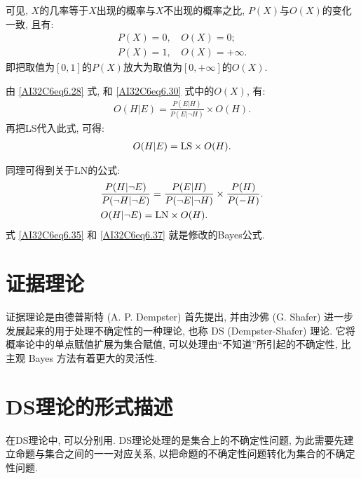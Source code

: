 可见, $X$的几率等于$X$出现的概率与$X$不出现的概率之比, $P(X)$与$O(X)$的变化一致, 且有:
\begin{align}
    P(X)=0,&\,O(X)=0;\\
    P(X)=1,&\,O(X)=+\infty.
\end{align}
即把取值为$[0,1]$的$P(X)$放大为取值为$[0,+\infty]$的$O(X)$.

由 \eqref{AI32C6eq6.28} 式, 和 \eqref{AI32C6eq6.30} 式中的$O(X)$, 有:
\begin{align}
    O(H | E)=\frac{P(E | H)}{P(E | \neg H)} \times O(H).
\end{align}
再把LS代入此式, 可得:
\begin{align}\label{AI32C6eq6.35}
    O(H | E)=\textup{LS} \times O(H).
\end{align}

同理可得到关于LN的公式:
\begin{align}
    &\frac{P(H|\neg E)}{P(\neg H|\neg E)}=\frac{P(E | H)}{P(\neg E |\neg H)} \times \frac{P(H)}{P(-H)}.\label{AI32C6eq6.36} \\
    &O(H| \neg E)=\textup{LN} \times O(H). \label{AI32C6eq6.37}
\end{align}
式 \eqref{AI32C6eq6.35} 和 \eqref{AI32C6eq6.37} 就是修改的Bayes公式.
\section{证据理论}
证据理论是由德普斯特 (A. P. Dempster) 首先提出, 并由沙佛 (G. Shafer) 进一步发展起来的用于处理不确定性的一种理论, 也称 DS (Dempster-Shafer) 理论.
它将概率论中的单点赋值扩展为集合赋值, 可以处理由“不知道”所引起的不确定性, 比主观 Bayes 方法有着更大的灵活性.
\section{DS理论的形式描述}
    在DS理论中, 可以分别用.
DS理论处理的是集合上的不确定性问题, 为此需要先建立命题与集合之间的一一对应关系, 以把命题的不确定性问题转化为集合的不确定性问题. 

